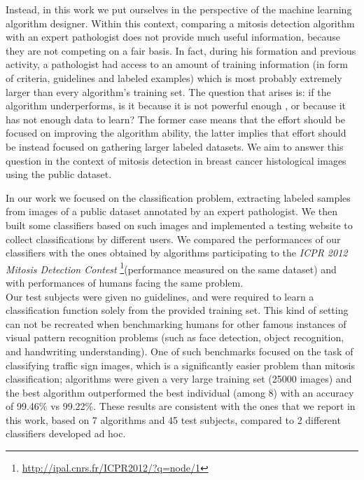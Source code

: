 Instead, in this work we put ourselves in the perspective of the machine learning algorithm designer. Within this context, comparing a
mitosis detection algorithm with an expert pathologist does not provide
much useful information, because they are not competing on a fair basis. In fact, during
his formation and previous activity, a pathologist had access to an amount of training information (in form of criteria, guidelines and labeled examples) which is
most probably extremely larger than every algorithm's training set. The question that arises is: if the algorithm
underperforms, is it because it is not powerful enough , or because it has not enough data to learn?
The former case means that the effort should be focused on improving the algorithm ability, the latter implies that effort should be instead focused on gathering larger labeled datasets.
We aim to answer this question in the context of mitosis detection in breast
cancer histological images using the public dataset.

\vspace{0.2cm}

In our work we focused on the classification problem, extracting labeled samples from images of a public dataset annotated by an expert pathologist.
We then built some classifiers based on such images and implemented a testing website to collect classifications by different users.
We compared the performances of our classifiers with the ones obtained by algorithms participating to the \textit{ICPR 2012 Mitosis Detection Contest}
\footnote{\url{http://ipal.cnrs.fr/ICPR2012/?q=node/1}}(performance measured on the same dataset) and with performances of humans facing the same problem.\\
Our test subjects were given no guidelines, and were required to
learn a classification function solely from the provided training set.
This kind of setting can not be recreated when benchmarking humans for other famous instances of visual pattern recognition problems (such as
face detection, object recognition, and handwriting understanding). One of such
benchmarks \cite{ML_traffic} focused on the task of classifying traffic sign images, which is a
significantly easier problem than mitosis classification; algorithms were given a
very large training set (25000 images) and the best algorithm outperformed the best
individual (among 8) with an accuracy of 99.46\% vs 99.22\%.
These results are consistent with the ones that we report in this work, based on 7 algorithms and 45 test subjects, compared to 2 different classifiers developed ad hoc.




